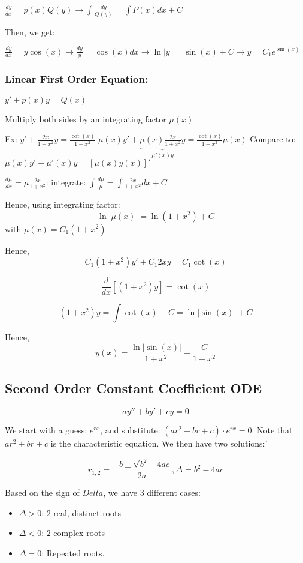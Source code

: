 \documentclass{article}
\begin{document}
$\frac{dy}{dx} = p(x) Q(y) \longrightarrow \int{\frac{dy}{Q(y)}} = \int{P(x) dx + C}$

Then, we get:

$\frac{dy}{dx} = y \cos(x) \rightarrow \frac{dy}{y} = \cos(x) dx \longrightarrow \ln{|y|} = \sin(x) + C \rightarrow y = C_1 e^{\sin(x)}$

\subsubsection{Linear First Order Equation:}

$y' + p(x) y = Q(x)$

Multiply both sides by an integrating factor $\mu(x)$

Ex: $y' + \frac{2x}{1 + x^2} y = \frac{\cot(x)}{1 + x^2}$
$\mu(x) y' + \underbrace{\mu(x) \frac{2x}{1 + x^2} y}_{\mu'(x) y} = \frac{\cot(x)}{1 + x^2} \mu(x)$
Compare to: $\mu(x) y' + \mu'(x) y = \left[\mu(x) y(x) \right]'$

$\frac{d \mu}{dx} = \mu \frac{2x}{1 + x^2}$: integrate: $\int{\frac{d \mu}{\mu}} = \int{\frac{2x}{1 + x^2} dx + C}$

Hence, using integrating factor: $$ \ln |\mu(x)| = \ln(1 + x^2) + C$$ with $\mu(x) = C_1 (1 + x^2)$

Hence, $$C_1(1 + x^2) y' + C_1 2xy = C_1 \cot(x)$$

$$\frac{d}{dx} \left[ (1 + x^2) y \right] = \cot(x)$$

$$(1+x^2)y = \int \cot(x) + C = \ln|\sin(x)| + C$$

Hence, $$y(x) = \frac{\ln|\sin(x)|}{1+x^2} + \frac{C}{1+x^2}$$

\subsection{Second Order Constant Coefficient ODE}

$$ay'' + by' + cy = 0$$

We start with a guess: $e^{rx}$, and substitute: $(ar^2 + br + c) \cdot e^{rx} = 0$. Note that $ar^2 + br + c$ is the characteristic equation. We then have two solutions:'

$$r_{1,2} = \frac{-b \pm \sqrt{b^2 - 4ac}}{2a}, \Delta = b^2 - 4ac$$

Based on the sign of $Delta$, we have 3 different cases:

\begin{itemize}
    \item $\Delta > 0$: 2 real, distinct roots
    \item $\Delta < 0$: 2 complex roots
    \item $\Delta = 0$: Repeated roots. 
\end{itemize}
\end{document}
